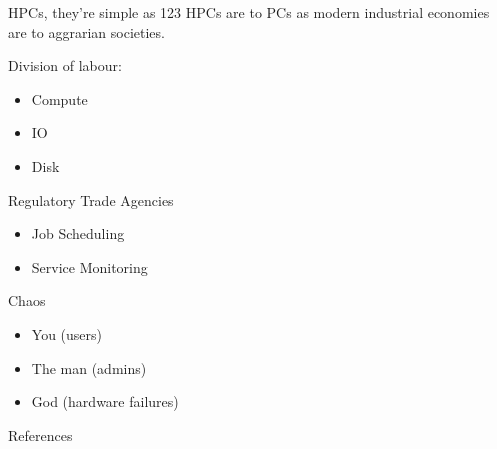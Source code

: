 \documentclass[10pt]{beamer}              %
\begin{document}
\begin{frame}[fragile]{HPCs, they're simple as 123}
    HPCs are to PCs as modern industrial economies are to aggrarian societies.
    \begin{description}
        \item Division of labour: 
        \begin{itemize}
            \item Compute
            \item IO
            \item Disk
        \end{itemize}
        \item Regulatory Trade Agencies
        \begin{itemize}
            \item Job Scheduling
            \item Service Monitoring
        \end{itemize}
        \item Chaos
        \begin{itemize}
            \item You (users)
            \item The man (admins)
            \item God (hardware failures)
        \end{itemize}
    \end{description}
\end{frame}
\begin{frame}[allowframebreaks]{References}

  
  

\end{frame}
\end{document}
